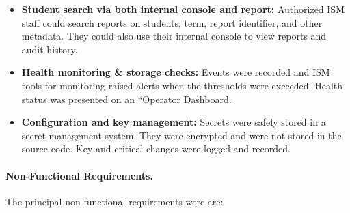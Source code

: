 \begin{itemize}
    \item \textbf{Student search via both internal console and report:} Authorized ISM staff could search reports on students, term, report identifier, and other metadata. They could also use their internal console to view reports and audit history.

    \item \textbf{Health monitoring \& storage checks:} Events were recorded and ISM tools for monitoring raised alerts when the thresholds were exceeded. Health status was presented on an ``Operator Dashboard.

    \item \textbf{Configuration and key management:} Secrets were safely stored in a secret management system. They were encrypted and were not stored in the source code. Key and critical changes were logged and recorded.
\end{itemize}

\paragraph{Non-Functional Requirements.}
The principal non-functional requirements were are:

